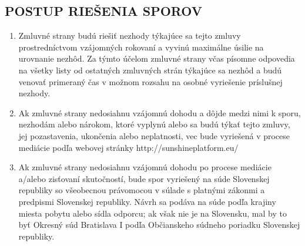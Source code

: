 \documentclass[a4paper]{article}
\begin{document}
\begin{multicols}{2}
\subsection{POSTUP RIEŠENIA SPOROV}
\begin{enumerate}
    \item Zmluvné strany budú riešiť nezhody týkajúce sa tejto zmluvy prostredníctvom vzájomných rokovaní a vyvinú maximálne úsilie na urovnanie nezhôd. Za týmto účelom zmluvné strany včas písomne odpovedia na všetky listy od ostatných zmluvných strán týkajúce sa nezhôd a budú venovať primeraný čas v možnom rozsahu na osobné vyriešenie príslušnej nezhody.
    \item Ak zmluvné strany nedosiahnu vzájomnú dohodu a dôjde medzi nimi k sporu, nezhodám alebo nárokom, ktoré vyplynú alebo sa budú týkať tejto zmluvy, jej pozastavenia, ukončenia alebo neplatnosti, vec bude vyriešená v procese mediácie podľa webovej stránky http://sunshineplatform.eu/ 
    \item Ak zmluvné strany nedosiahnu vzájomnú dohodu po procese mediácie a/alebo zisťovaní skutočností, bude spor vyriešený na súde Slovenskej republiky so všeobecnou právomocou v súlade s platnými zákonmi a predpismi  Slovenskej republiky. Návrh sa podáva na súde podľa krajiny miesta pobytu alebo sídla odporcu; ak však nie je na Slovensku, mal by to byť Okresný súd Bratislava I podľa Občianskeho súdneho poriadku Slovenskej republiky.
\end{enumerate}

\end{multicols}
\end{document}
